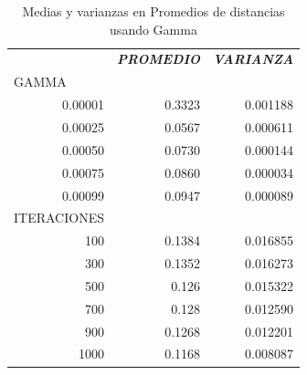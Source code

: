 \begin{table}[H]
\centering
\caption{Medias y varianzas en Promedios de distancias usando Gamma}
\begin{tabular}{rrr}
\multicolumn{1}{l}{}            & \multicolumn{1}{c}{\textit{\textbf{PROMEDIO}}} & \multicolumn{1}{c}{\textit{\textbf{VARIANZA}}} \\ 
\multicolumn{1}{l}{GAMMA}       & \multicolumn{1}{l}{}                           & \multicolumn{1}{l}{}                           \\
0.00001                         & 0.3323                                         & 0.001188                                       \\
0.00025                         & 0.0567                                         & 0.000611                                       \\
0.00050                         & 0.0730                                         & 0.000144                                       \\
0.00075                         & 0.0860                                         & 0.000034                                       \\
0.00099                         & 0.0947                                         & 0.000089                                       \\
\multicolumn{1}{l}{ITERACIONES} & \multicolumn{1}{l}{}                           & \multicolumn{1}{l}{}                           \\
100                             & 0.1384                                         & 0.016855                                       \\
300                             & 0.1352                                         & 0.016273                                       \\
500                             & 0.126                                          & 0.015322                                       \\
700                             & 0.128                                          & 0.012590                                       \\
900                             & 0.1268                                         & 0.012201                                       \\
1000                            & 0.1168                                         & 0.008087                                      
\end{tabular}
\label{media_var_1}
\end{table}

